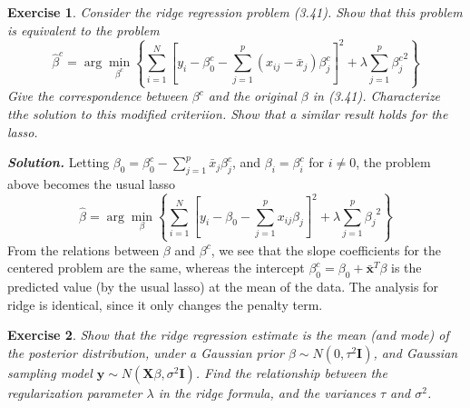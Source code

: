 \documentclass[12pt]{article}
\def\bx{\textbf{x}}
\def\bX{\textbf{X}}
\def\by{\textbf{y}}
\def\bI{\textbf{I}}
\newtheorem{exercise}{Exercise}[section]
\newenvironment{solution}[1][\it{Solution}]{\textbf{#1. } }{\vspace{.5cm}}
\begin{document}
\begin{exercise} Consider the ridge regression problem (3.41). Show that this problem is equivalent to the problem
$$\hat{\beta}^c = \arg \min_{\beta^c} \left\{ \sum_{i = 1}^N [y_i - \beta_0^c - \sum_{j = 1}^p (x_{ij} - \bar{x}_j)\beta_j^c]^2 + \lambda \sum_{j =1}^p {\beta_j^c}^2 \right\}$$
Give the correspondence between $\beta^c$ and the original $\beta$ in (3.41). Characterize tthe solution to this modified criteriion. Show that a similar result holds for the lasso.
\end{exercise}
\begin{solution} Letting $\beta_0 = \beta_0^c - \sum_{j=1}^p \bar{x}_j \beta_j^c$, and $\beta_i = \beta_i^c$ for $i \neq 0$, the problem above becomes the usual lasso
$$\hat{\beta} = \arg \min_{\beta} \left\{ \sum_{i = 1}^N [y_i - \beta_0 - \sum_{j = 1}^p x_{ij}\beta_j]^2 + \lambda \sum_{j =1}^p {\beta_j}^2 \right\}$$
From the relations between $\beta$ and $\beta^c$, we see that the slope coefficients for the centered problem are the same, whereas the intercept $\beta^c_0 = \beta_0 + \bar{\bx}^T \beta$ is the predicted value (by the usual lasso) at the mean of the data. The analysis for ridge is identical, since it only changes the penalty term.
\end{solution}
\begin{exercise}
    Show that the ridge regression estimate is the mean (and mode) of the posterior distribution, under a Gaussian prior $\beta \sim N(0, \tau^2 \bI)$, and Gaussian sampling model $\by \sim N(\bX \beta, \sigma^2 \bI)$. Find the relationship between the regularization parameter $\lambda$ in the ridge formula, and the variances $\tau$ and $\sigma^2$.
\end{exercise}
\end{document}
